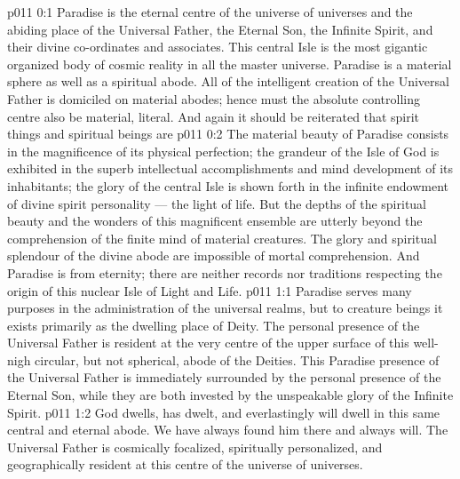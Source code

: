 \author{Perfector of Wisdom}
\vs p011 0:1 Paradise is the eternal centre of the universe of universes and the abiding place of the Universal Father, the Eternal Son, the Infinite Spirit, and their divine co\hyp{}ordinates and associates. This central Isle is the most gigantic organized body of cosmic reality in all the master universe. Paradise is a material sphere as well as a spiritual abode. All of the intelligent creation of the Universal Father is domiciled on material abodes; hence must the absolute controlling centre also be material, literal. And again it should be reiterated that spirit things and spiritual beings are 
\vs p011 0:2 The material beauty of Paradise consists in the magnificence of its physical perfection; the grandeur of the Isle of God is exhibited in the superb intellectual accomplishments and mind development of its inhabitants; the glory of the central Isle is shown forth in the infinite endowment of divine spirit personality --- the light of life. But the depths of the spiritual beauty and the wonders of this magnificent ensemble are utterly beyond the comprehension of the finite mind of material creatures. The glory and spiritual splendour of the divine abode are impossible of mortal comprehension. And Paradise is from eternity; there are neither records nor traditions respecting the origin of this nuclear Isle of Light and Life.
\vs p011 1:1 Paradise serves many purposes in the administration of the universal realms, but to creature beings it exists primarily as the dwelling place of Deity. The personal presence of the Universal Father is resident at the very centre of the upper surface of this well\hyp{}nigh circular, but not spherical, abode of the Deities. This Paradise presence of the Universal Father is immediately surrounded by the personal presence of the Eternal Son, while they are both invested by the unspeakable glory of the Infinite Spirit.
\vs p011 1:2 God dwells, has dwelt, and everlastingly will dwell in this same central and eternal abode. We have always found him there and always will. The Universal Father is cosmically focalized, spiritually personalized, and geographically resident at this centre of the universe of universes.
